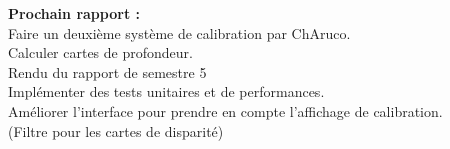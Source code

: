 \documentclass{article}
\begin{document}
\textbf{Prochain rapport :}\\
Faire un deuxième système de calibration par ChAruco.\\
Calculer cartes de profondeur.\\
Rendu du rapport de semestre 5\\
Implémenter des tests unitaires et de performances.\\
Améliorer l'interface pour prendre en compte l'affichage de calibration.\\
(Filtre pour les cartes de disparité)\\
\\\\
\end{document}
